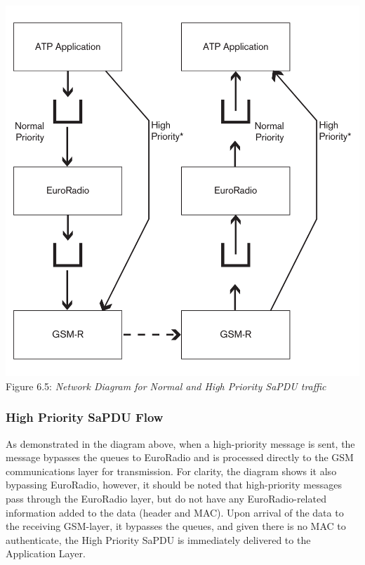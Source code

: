 \documentclass[twoside,11pt,a4paper]{article}
\begin{document}
\begin{center}
 \includegraphics[scale=0.5]{HP-Diagram.pdf}\\
Figure 6.5: \textit{Network Diagram for Normal and High Priority SaPDU traffic}
\end{center}

\subsubsection{High Priority SaPDU Flow}
As demonstrated in the diagram above, when a high-priority message is sent, the message bypasses the queues to EuroRadio and is processed directly to the GSM communications layer for transmission. For clarity, the diagram shows it also bypassing EuroRadio, however, it should be noted that high-priority messages pass through the EuroRadio layer, but do not have any EuroRadio-related information added to the data (header and MAC). Upon arrival of the data to the receiving GSM-layer, it bypasses the queues, and given there is no MAC to authenticate, the High Priority SaPDU is immediately delivered to the Application Layer.
\end{document}
